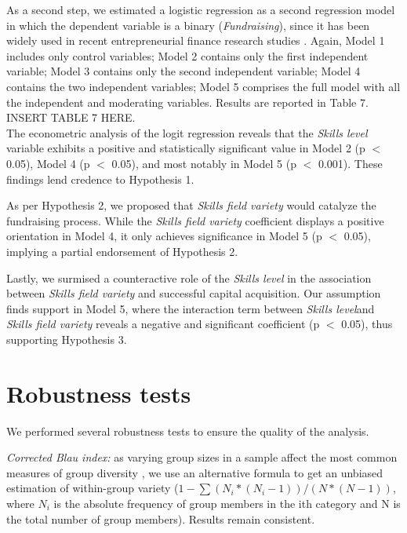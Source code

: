 \documentclass[12pt]{article}
\begin{document}
As a second step, we estimated a logistic regression as a second regression model in which the dependent variable is a binary (\textit{Fundraising}), since it has been widely used in recent entrepreneurial finance research studies \citep{ahlers2015signaling, islam2018signaling}. Again, Model 1 includes only control variables; Model 2 contains only the first independent variable; Model 3 contains only the second independent variable; Model 4 contains the two independent variables; Model 5 comprises the full model with all the independent and moderating variables. Results are reported in Table 7\label{table7}. \\

INSERT TABLE 7 HERE. \\

The econometric analysis of the logit regression reveals that the \textit{Skills level} variable exhibits a positive and statistically significant value in Model 2 (p $<$ 0.05), Model 4 (p $<$ 0.05), and most notably in Model 5 (p $<$ 0.001). These findings lend credence to Hypothesis 1.

As per Hypothesis 2, we proposed that \textit{Skills field variety} would catalyze the fundraising process. While the \textit{Skills field variety} coefficient displays a positive orientation in Model 4, it only achieves significance in Model 5 (p $<$ 0.05), implying a partial endorsement of Hypothesis 2.

Lastly, we surmised a counteractive role of the \textit{Skills level} in the association between \textit{Skills field variety} and successful capital acquisition. Our assumption finds support in Model 5, where the interaction term between \textit{Skills level}and \textit{Skills field variety} reveals a negative and significant coefficient (p $<$  0.05), thus supporting Hypothesis 3.

\section{Robustness tests}

We performed several robustness tests to ensure the quality of the analysis.

\textit{Corrected Blau index:} as varying group sizes in a sample affect the most common measures of group diversity \citep{biemann2010size}, we use an alternative formula to get an unbiased estimation of within-group variety ($1 - \sum(N_i*(N_i - 1))/(N*(N - 1))$, where $N_i$ is the absolute frequency of group members in the ith category and N is the total number of group members). Results remain consistent.
\end{document}
